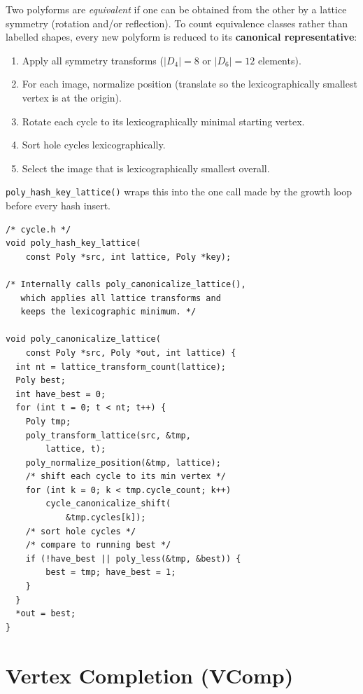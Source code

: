 \documentclass[10pt,a4paper]{article}
\newcommand{\code}[1]{\texttt{\small #1}}
\newcommand{\file}[1]{\texttt{\footnotesize #1}}
\begin{document}
\begin{tcolorbox}[dualbox, title=Canonical Form — \file{src/core/cycle.c\,/\,cycle.h}]
  Two polyforms are \emph{equivalent} if one can be obtained from the
  other by a lattice symmetry (rotation and/or reflection).  To count
  equivalence classes rather than labelled shapes, every new polyform
  is reduced to its \textbf{canonical representative}:

  \begin{enumerate}
    \item Apply all symmetry transforms ($|D_4|{=}8$ or
      $|D_6|{=}12$ elements).
    \item For each image, normalize position (translate so the
      lexicographically smallest vertex is at the origin).
    \item Rotate each cycle to its lexicographically minimal starting
      vertex.
    \item Sort hole cycles lexicographically.
    \item Select the image that is lexicographically smallest
      overall.
  \end{enumerate}

  \code{poly\_hash\_key\_lattice()} wraps this into the one call
  made by the growth loop before every hash insert.
\tcblower
\begin{verbatim}
/* cycle.h */
void poly_hash_key_lattice(
    const Poly *src, int lattice, Poly *key);

/* Internally calls poly_canonicalize_lattice(),
   which applies all lattice transforms and
   keeps the lexicographic minimum. */

void poly_canonicalize_lattice(
    const Poly *src, Poly *out, int lattice) {
  int nt = lattice_transform_count(lattice);
  Poly best;
  int have_best = 0;
  for (int t = 0; t < nt; t++) {
    Poly tmp;
    poly_transform_lattice(src, &tmp,
        lattice, t);
    poly_normalize_position(&tmp, lattice);
    /* shift each cycle to its min vertex */
    for (int k = 0; k < tmp.cycle_count; k++)
        cycle_canonicalize_shift(
            &tmp.cycles[k]);
    /* sort hole cycles */
    /* compare to running best */
    if (!have_best || poly_less(&tmp, &best)) {
        best = tmp; have_best = 1;
    }
  }
  *out = best;
}
\end{verbatim}
\end{tcolorbox}

\section{Vertex Completion (VComp)}
\end{document}
